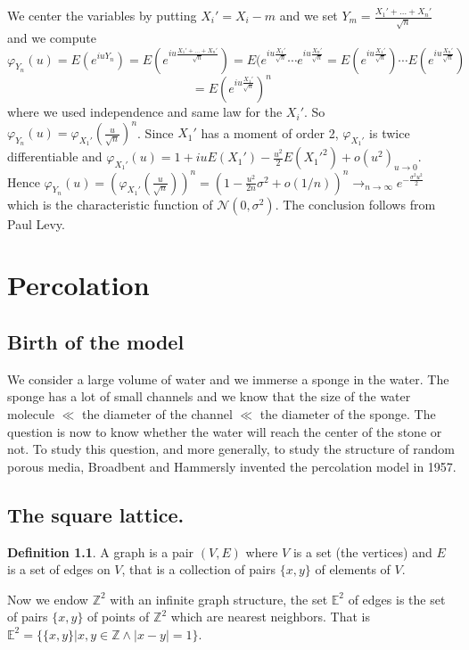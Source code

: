 \documentclass[10pt,a4paper]{book}
\theoremstyle{definition}
\newtheorem{definition}{Definition}[section]
\begin{document}
\proof We center the variables by putting $X_i'=X_i-m$ and we set $Y_m=\frac{X_1'+\ldots+X_n'}{\sqrt{n}}$ and we compute $$\varphi_{Y_n}(u)=E(e^{iuY_n})=E(e^{iu\frac{X_1'+\ldots+X_n'}{\sqrt{n}}})=E(e^{iu\frac{X_1'}{\sqrt{n}}}\cdots e^{iu\frac{X_n'}{\sqrt{n}}}=E(e^{iu\frac{X_1'}{\sqrt{n}}})\cdots E(e^{iu\frac{X_n'}{\sqrt{n}}})$$
$$=E(e^{iu\frac{X_1'}{\sqrt{n}}})^n$$
where we used independence and same law for the $X_i'$. So $\varphi_{Y_n}(u)=\varphi_{X_1'}(\frac{u}{\sqrt{n}})^n$. Since $X_1'$ has a moment of order 2, $\varphi_{X_1'}$ is twice differentiable and $\varphi_{X_1'}(u)=1+iuE(X_1')-\frac{u^2}{2}E(X_1'^2)+o(u^2)_{u\to 0}$. Hence 
$\varphi_{Y_n}(u)=(\varphi_{X_1'}(\frac{u}{\sqrt{n}}))^n=(1-\frac{u^2}{2n}\sigma^2+o(1/n))^n\to_{n\to\infty}e^{-\frac{\sigma^2u^2}{2}}$ which is the characteristic function of $\mathcal{N}(0,\sigma^2)$. The conclusion follows from Paul Levy.
%

\chapter{Percolation}

\section{Birth of the model}

We consider a large volume of water and we immerse a sponge in the water. The sponge has a lot of small channels and we know that the size of the water molecule $\ll$ the diameter of the channel $\ll$ the diameter of the sponge. The question is now to know whether the water will reach the center of the stone or not. To study this question, and more generally, to study the structure of random porous media, Broadbent and Hammersly invented the percolation model in 1957. 

\section{The square lattice.}

\begin{definition}
A graph is a pair $(V, E)$ where $V$ is a set (the vertices) and $E$ is a set of edges on $V$, that is a collection of pairs $\{x, y\}$ of elements of $V$. 
\end{definition}

Now we endow $\mathbb{Z}^2$ with an infinite graph structure, the set $\mathbb{E}^2$ of edges is the set of pairs $\{x, y\}$ of points of $\mathbb{Z}^2$ which are nearest neighbors. That is $\mathbb{E}^2 = \{ \{x, y\} | x, y \in \mathbb{Z} \land |x - y| = 1\}$. 
\end{document}
